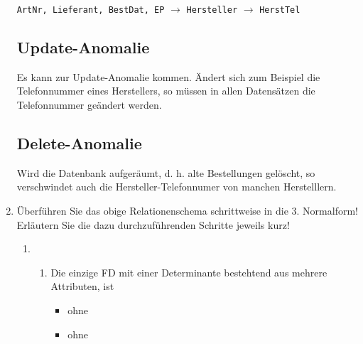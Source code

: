 \documentclass{lehramt-informatik-aufgabe}
\begin{document}
\begin{enumerate}
\begin{liAntwort}
\bigskip

\texttt{ArtNr, Lieferant, BestDat, EP}
$\rightarrow$ \texttt{Hersteller}
$\rightarrow$ \texttt{HerstTel}

\subsection*{Update-Anomalie}

Es kann zur Update-Anomalie kommen. Ändert sich zum Beispiel die
Telefonnummer eines Herstellers, so müssen in allen
Datensätzen die Telefonnummer geändert werden.

\subsection*{Delete-Anomalie}

Wird die Datenbank aufgeräumt, d. h. alte Bestellungen gelöscht,
so verschwindet auch die Hersteller-Telefonnumer von manchen
Herstelllern.
\end{liAntwort}


\item Überführen Sie das obige Relationenschema schrittweise in die 3.
Normalform! Erläutern Sie die dazu durchzuführenden Schritte jeweils
kurz!

\begin{liAntwort}

\begin{enumerate}
\item {}

\begin{enumerate}
\item {}


Die einzige FD mit einer Determinante bestehtend aus mehrere Attributen,
ist 

\begin{itemize}
\item ohne 


\item ohne 



\end{itemize}
\end{enumerate}
\end{enumerate}
\end{liAntwort}
\end{enumerate}
\end{document}
